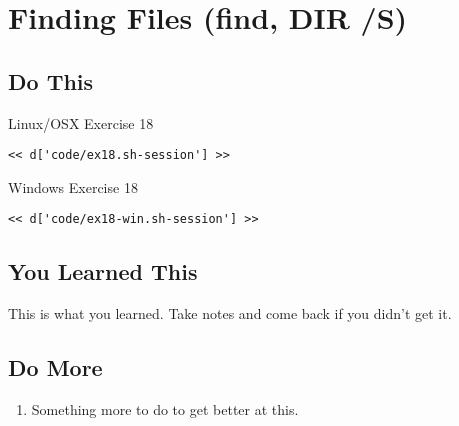 \chapter{Finding Files (find, DIR /S)}

\section{Do This}

\begin{code}{Linux/OSX Exercise 18}
\begin{Verbatim}
<< d['code/ex18.sh-session'] >>
\end{Verbatim}
\end{code}

\begin{code}{Windows Exercise 18}
\begin{Verbatim}
<< d['code/ex18-win.sh-session'] >>
\end{Verbatim}
\end{code}

\section{You Learned This}

This is what you learned.  Take notes and come back if you didn't get it.

\section{Do More}

\begin{enumerate}
\item Something more to do to get better at this.
\end{enumerate}

